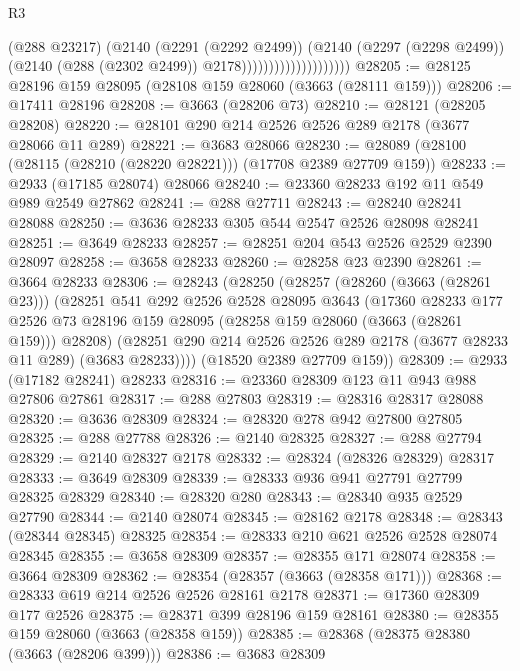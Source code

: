 \begin{lexlean}{R3}
\begin{coremodule}
                                      (@288 @23217)
                                      (@2140
                                        (@2291 (@2292 @2499))
                                        (@2140
                                          (@2297 (@2298 @2499))
                                          (@2140 (@288 (@2302 @2499)) @2178))))))))))))))))))))
@28205 := @28125 @28196 @159 @28095 (@28108 @159 @28060 (@3663 (@28111 @159)))
@28206 := @17411 @28196
@28208 := @3663 (@28206 @73)
@28210 := @28121 (@28205 @28208)
@28220 := @28101 @290 @214 @2526 @2526 @289 @2178 (@3677 @28066 @11 @289)
@28221 := @3683 @28066
@28230 := @28089 (@28100 (@28115 (@28210 (@28220 @28221))) (@17708 @2389 @27709 @159))
@28233 := @2933 (@17185 @28074) @28066
@28240 := @23360 @28233 @192 @11 @549 @989 @2549 @27862
@28241 := @288 @27711
@28243 := @28240 @28241 @28088
@28250 := @3636 @28233 @305 @544 @2547 @2526 @28098 @28241
@28251 := @3649 @28233
@28257 := @28251 @204 @543 @2526 @2529 @2390 @28097
@28258 := @3658 @28233
@28260 := @28258 @23 @2390
@28261 := @3664 @28233
@28306 := @28243
    (@28250
      (@28257
        (@28260 (@3663 (@28261 @23)))
        (@28251
          @541
          @292
          @2526
          @2528
          @28095
          @3643
          (@17360
            @28233
            @177
            @2526
            @73
            @28196
            @159
            @28095
            (@28258 @159 @28060 (@3663 (@28261 @159)))
            @28208)
          (@28251 @290 @214 @2526 @2526 @289 @2178 (@3677 @28233 @11 @289) (@3683 @28233))))
      (@18520 @2389 @27709 @159))
@28309 := @2933 (@17182 @28241) @28233
@28316 := @23360 @28309 @123 @11 @943 @988 @27806 @27861
@28317 := @288 @27803
@28319 := @28316 @28317 @28088
@28320 := @3636 @28309
@28324 := @28320 @278 @942 @27800 @27805
@28325 := @288 @27788
@28326 := @2140 @28325
@28327 := @288 @27794
@28329 := @2140 @28327 @2178
@28332 := @28324 (@28326 @28329) @28317
@28333 := @3649 @28309
@28339 := @28333 @936 @941 @27791 @27799 @28325 @28329
@28340 := @28320 @280
@28343 := @28340 @935 @2529 @27790
@28344 := @2140 @28074
@28345 := @28162 @2178
@28348 := @28343 (@28344 @28345) @28325
@28354 := @28333 @210 @621 @2526 @2528 @28074 @28345
@28355 := @3658 @28309
@28357 := @28355 @171 @28074
@28358 := @3664 @28309
@28362 := @28354 (@28357 (@3663 (@28358 @171)))
@28368 := @28333 @619 @214 @2526 @2526 @28161 @2178
@28371 := @17360 @28309 @177 @2526
@28375 := @28371 @399 @28196 @159 @28161
@28380 := @28355 @159 @28060 (@3663 (@28358 @159))
@28385 := @28368 (@28375 @28380 (@3663 (@28206 @399)))
@28386 := @3683 @28309

\end{coremodule}
\end{lexlean}
